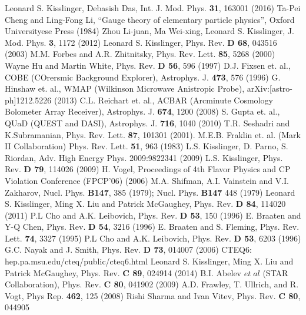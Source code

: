 \begin{thebibliography}{99}
 Leonard S. Kisslinger, Debasish Das, Int. J. Mod. Phys. {\bf 31},
163001 (2016)
 Ta-Pei Cheng and Ling-Fong Li, ``Gauge theory of elementary
particle physics'', Oxford Universityese Press (1984)
Zhou Li-juan, Ma Wei-xing, Leonard S. Kisslinger, J. Mod. Phys. 
{\bf 3}, 1172 (2012)
 Leonard S. Kisslinger, Phys. Rev. {\bf D 68}, 043516 (2003)
M.M. Forbes and A.R. Zhitnitsky, Phys. Rev. Lett. {\bf 85},
 5268 (2000)
 Wayne Hu and Martin White, Phys. Rev. {\bf D 56}, 596 (1997)
 D.J. Fixsen et. al., COBE (COrersmic Background Explorer),
Astrophys. J. {\bf 473}, 576 (1996)
 G. Hinshaw et. al., WMAP (Wilkinson Microwave Anistropic 
Probe), arXiv:[astro-ph]1212.5226 (2013)
 C.L. Reichart et. al., ACBAR (Arcminute Cosmology Bolometer 
Array Receiver), Astrophys. J. {\bf 674}, 1200 (2008)
 S. Gupta et. al., QUaD (QUEST and DASI),  Astrophys. J. 
{\bf 716}, 1040 (2010)
T.R. Seshadri and K.Subramanian,  Phys. Rev. Lett. {\bf 87},
 101301 (2001).
 M.E.B. Fraklin et. al. (Mark II Collaboration) Phys. Rev. 
Lett. {\bf 51}, 963 (1983)
 L.S. Kisslinger, D. Parno, S. Riordan, Adv. High Energy Phys. 
2009:9822341 (2009)
  L.S. Kisslinger, Phys. Rev. {\bf D 79}, 114026 (2009)
H. Vogel, Proceedings of 4th Flavor Physics and CP Violation
Conference (FPCP'06) (2006)
 M.A. Shifman, A.I. Vainstein and V.I. Zakharov, Nucl. Phys.
{\bf B147}, 385 (1979); Nucl. Phys. {\bf B147} 448 (1979)
 Leonard S. Kisslinger, Ming X. Liu and Patrick McGaughey,
 Phys. Rev. {\bf D 84}, 114020 (2011)
P.L Cho and A.K. Leibovich, Phys. Rev. {\bf D 53}, 150 (1996)
E. Braaten and Y-Q Chen, Phys. Rev. {\bf D 54}, 3216 (1996)
E. Braaten and S. Fleming, Phys. Rev. Lett. {\bf 74}, 3327 
(1995)
P.L Cho and A.K. Leibovich, Phys. Rev. {\bf D 53}, 6203 (1996)
 G.C. Nayak and J. Smith, Phys. Rev. {\bf D 73}, 014007 (2006)
 CTEQ6: hep.pa.msu.edu/cteq/public/cteq6.html
  Leonard S. Kisslinger, Ming X. Liu and Patrick McGaughey,
 Phys. Rev. {\bf C 89}, 024914 (2014)
 B.I. Abelev $et\;al$ (STAR Collaboration), Phys. Rev. 
{\bf C 80}, 041902 (2009)
 A.D. Frawley, T. Ullrich, and R. Vogt, Phys Rep. {\bf 462},
125 (2008)
 Rishi Sharma and Ivan Vitev,  Phys. Rev. {\bf C 80}, 044905

\end{thebibliography}
